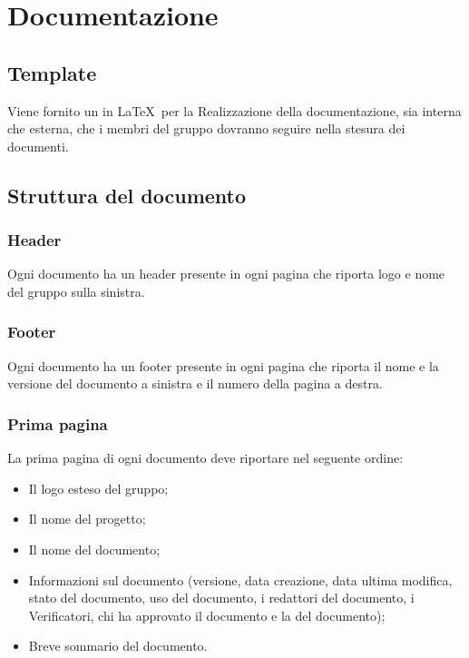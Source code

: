 \newpage
\section{Documentazione}
\label{5.0}

\subsection{Template}
\label{5.1}
Viene fornito un  in \LaTeX\ per la Realizzazione della documentazione, sia interna che esterna, che i membri del gruppo dovranno seguire nella stesura dei documenti.

\subsection{Struttura del documento}
\label{5.2}

\subsubsection{Header}
\label{5.2.1}
Ogni documento ha un header presente in ogni pagina che riporta logo e nome del gruppo sulla sinistra.

\subsubsection{Footer}
\label{5.2.2}
Ogni documento ha un footer presente in ogni pagina che riporta il nome e la versione del documento a sinistra e il numero della pagina a destra.

\subsubsection{Prima pagina}
\label{5.2.3}
La prima pagina di ogni documento deve riportare nel seguente ordine:
\begin{itemize}
\item Il logo esteso del gruppo;
\item Il nome del progetto;
\item Il nome del documento;
\item Informazioni sul documento (versione, data creazione, data ultima modifica, stato del documento, uso del documento, i redattori del documento, i Verificatori, chi ha approvato il documento e la  del documento);
\item Breve sommario del documento.
\end{itemize}

